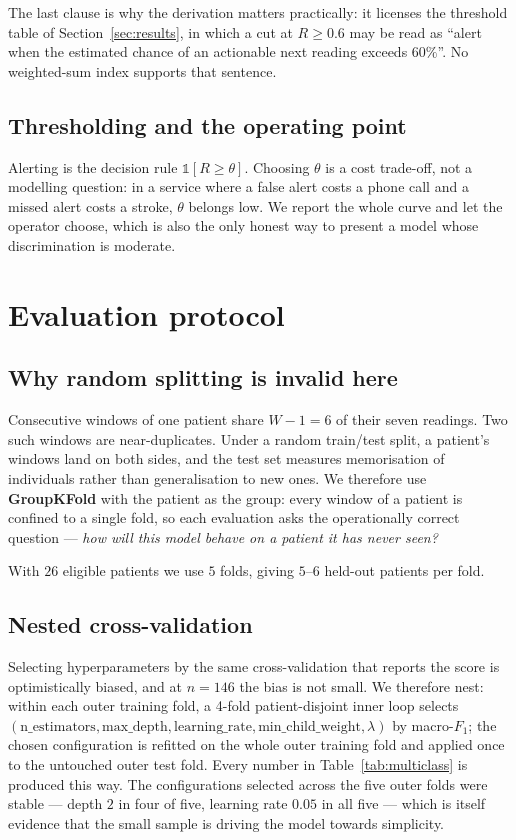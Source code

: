 \documentclass[11pt,a4paper]{article}
\begin{document}
The last clause is why the derivation matters practically: it licenses the
threshold table of Section~\ref{sec:results}, in which a cut at $R\ge 0.6$ may be
read as ``alert when the estimated chance of an actionable next reading exceeds
$60\%$''. No weighted-sum index supports that sentence.

\subsection{Thresholding and the operating point}

Alerting is the decision rule $\mathbb{1}[R \ge \theta]$. Choosing $\theta$ is a
cost trade-off, not a modelling question: in a service where a false alert costs a
phone call and a missed alert costs a stroke, $\theta$ belongs low. We report the
whole curve and let the operator choose, which is also the only honest way to
present a model whose discrimination is moderate.

\section{Evaluation protocol}
\label{sec:protocol}

\subsection{Why random splitting is invalid here}

Consecutive windows of one patient share $W-1 = 6$ of their seven readings. Two
such windows are near-duplicates. Under a random train/test split, a patient's
windows land on both sides, and the test set measures memorisation of individuals
rather than generalisation to new ones. We therefore use \textbf{GroupKFold} with
the patient as the group: every window of a patient is confined to a single fold,
so each evaluation asks the operationally correct question --- \emph{how will this
model behave on a patient it has never seen?}

With $26$ eligible patients we use $5$ folds, giving $5$--$6$ held-out patients per
fold.

\subsection{Nested cross-validation}

Selecting hyperparameters by the same cross-validation that reports the score is
optimistically biased, and at $n=146$ the bias is not small. We therefore nest:
within each outer training fold, a 4-fold patient-disjoint inner loop selects
$(\text{n\_estimators}, \text{max\_depth}, \text{learning\_rate},
\text{min\_child\_weight}, \lambda)$ by macro-$F_1$; the chosen configuration is
refitted on the whole outer training fold and applied once to the untouched outer
test fold. Every number in Table~\ref{tab:multiclass} is produced this way.
The configurations selected across the five outer folds were stable --- depth $2$
in four of five, learning rate $0.05$ in all five --- which is itself evidence that
the small sample is driving the model towards simplicity.
\end{document}
